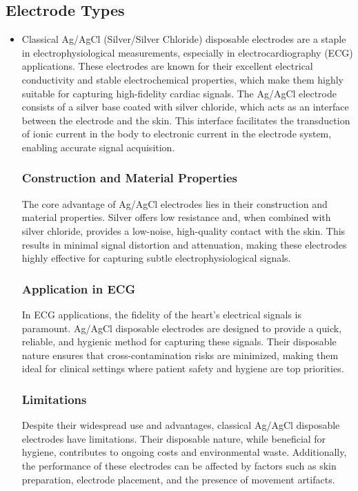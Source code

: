 \documentclass[conference]{IEEEtran}
\begin{document}
\subsection{Electrode Types}
\begin{itemize}
    \item Classical Ag/AgCl (Silver/Silver Chloride) disposable electrodes are a staple in electrophysiological measurements, especially in electrocardiography (ECG) applications. These electrodes are known for their excellent electrical conductivity and stable electrochemical properties, which make them highly suitable for capturing high-fidelity cardiac signals. The Ag/AgCl electrode consists of a silver base coated with silver chloride, which acts as an interface between the electrode and the skin. This interface facilitates the transduction of ionic current in the body to electronic current in the electrode system, enabling accurate signal acquisition.

\subsubsection{Construction and Material Properties}
The core advantage of Ag/AgCl electrodes lies in their construction and material properties. Silver offers low resistance and, when combined with silver chloride, provides a low-noise, high-quality contact with the skin. This results in minimal signal distortion and attenuation, making these electrodes highly effective for capturing subtle electrophysiological signals.

\subsubsection{Application in ECG}
In ECG applications, the fidelity of the heart's electrical signals is paramount. Ag/AgCl disposable electrodes are designed to provide a quick, reliable, and hygienic method for capturing these signals. Their disposable nature ensures that cross-contamination risks are minimized, making them ideal for clinical settings where patient safety and hygiene are top priorities.

\subsubsection{Limitations}
Despite their widespread use and advantages, classical Ag/AgCl disposable electrodes have limitations. Their disposable nature, while beneficial for hygiene, contributes to ongoing costs and environmental waste. Additionally, the performance of these electrodes can be affected by factors such as skin preparation, electrode placement, and the presence of movement artifacts.


\end{itemize}
\end{document}
